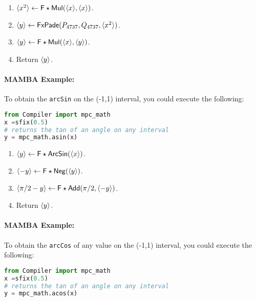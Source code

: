 \begin{enumerate}
\item $\langle x^2 \rangle \leftarrow \mathsf{F\star Mul}(\langle x \rangle,\langle x \rangle)$.
\item $\langle y \rangle \leftarrow \mathsf{FxPade}(P_{4737},Q_{4737},\langle x^2 \rangle)$.
\item $\langle y \rangle \leftarrow \mathsf{F\star Mul}(\langle x \rangle,\langle y \rangle)$.
\item Return $\langle y \rangle$.
\end{enumerate}


\paragraph{MAMBA Example:} To obtain the \verb|arcSin| on the  (-1,1) interval, you could execute the following:
\begin{lstlisting}[language={python}]
from Compiler import mpc_math
x =sfix(0.5)
# returns the tan of an angle on any interval
y = mpc_math.asin(x)
\end{lstlisting}


\begin{enumerate}
\item $\langle y \rangle \leftarrow \mathsf{F\star ArcSin}(\langle x \rangle)$.
\item $\langle -y \rangle \leftarrow \mathsf{F\star Neg}(\langle y \rangle)$.
\item $\langle \pi/2-y \rangle \leftarrow \mathsf{F\star Add}(\pi/2,\langle -y \rangle)$.
\item Return $\langle y \rangle$.
\end{enumerate}

\paragraph{MAMBA Example:} To obtain the \verb|arcCos| of any value on the (-1,1) interval, you could execute the following:
\begin{lstlisting}[language={python}]
from Compiler import mpc_math
x =sfix(0.5)
# returns the tan of an angle on any interval
y = mpc_math.acos(x)
\end{lstlisting}

